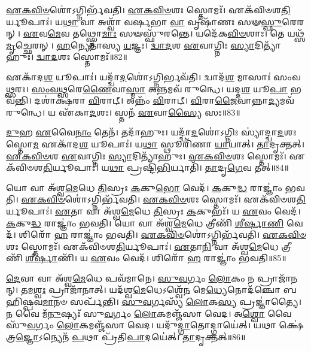 \-\ul{𑌏}\-\-\ul{𑌕}\-\-\ul{𑌵𑌿}\-\-\ul{𑍞}\-𑌶𑍋॑\-𑌽𑌗𑍍𑌨𑌿𑌰𑍍𑌭᳴𑌵𑌤𑌿।
\-\ul{𑌏}\-\-\ul{𑌕}\-\-\ul{𑌵𑌿}\-\-\ul{𑍞}\-𑌶𑌃 𑌸𑍍𑌤𑍋𑌮𑌃᳴।
𑌏𑌕᳴\-𑌵𑌿𑍞𑌶\-\ul{𑌤𑌿}\-𑌰𑍍𑌯𑍂𑌪𑌾𑌃॑।
𑌯\-\ul{𑌥𑌾} 𑌵𑌾 𑌅𑌶𑍍𑌵𑌾᳴ 𑌵𑌰𑍍\mbox{}\-\ul{𑌷}\-𑌭𑌾 \ul{𑌵𑌾} 𑌵𑍃𑌷𑌾᳴𑌣𑌃 𑌸𑍟\-\ul{𑌸𑍍𑌫𑍁}\-𑌰𑍇𑌰𑌨𑍍।
\-\ul{𑌏}\-𑌵\-\ul{𑌮𑍇}\-𑌵 𑌤𑌥𑍍𑌸𑍍𑌤𑍋\-\ul{𑌮𑌾𑌃} 𑌸𑍟𑌸𑍍𑌫𑍁᳴𑌰𑌨𑍍𑌤𑍇।
𑌯𑌦𑍇᳴𑌕\-\ul{𑌵𑌿}\-\-\ul{𑍞}\-𑌶𑌾𑌃।
𑌤𑍇 𑌯𑌥𑍍𑌸᳴\-\ul{𑌮𑍃}\-𑌚𑍍𑌛𑍇𑌰𑌨𑍍।
\-\ul{𑌹}\-𑌨𑍍𑌯𑍇𑌤𑌾॑𑌸𑍍𑌯 \ul{𑌯}\-𑌜𑍍𑌞𑌃।
\-\ul{𑌦𑍍𑌵𑌾}\-\-\ul{𑌦}\-𑌶 \ul{𑌏}\-𑌵𑌾𑌗𑍍𑌨𑌿𑌃 \ul{𑌸𑍍𑌯𑌾}\-𑌦𑌿𑌤𑍍𑌯𑌾᳴𑌹𑍁𑌃।
\-\ul{𑌦𑍍𑌵𑌾}\-\-\ul{𑌦}\-𑌶𑌃 𑌸𑍍𑌤𑍋𑌮𑌃᳴॥82॥

𑌏𑌕𑌾᳴𑌦\-\ul{𑌶} 𑌯𑍂𑌪𑌾𑌃॑।
𑌯𑌦𑍍𑌦𑍍𑌵𑌾᳴\-\ul{𑌦}\-𑌶𑍋॑\-𑌽𑌗𑍍𑌨𑌿𑌰𑍍𑌭𑌵᳴𑌤𑌿।
𑌦𑍍𑌵𑌾𑌦᳴\-\ul{𑌶} 𑌮𑌾𑌸𑌾𑌃॑ 𑌸𑌂𑌵\-\ul{𑌥𑍍𑌸}\-𑌰𑌃।
\-\ul{𑌸𑌂}\-\-\ul{𑌵}\-\-\ul{𑌥𑍍𑌸}\-𑌰𑍇\-\ul{𑌣𑍈}\-𑌵𑌾\-\ul{𑌸𑍍𑌮𑌾} 𑌅\-\ul{𑌨𑍍𑌨}\-𑌮𑌵᳴ 𑌰𑍁𑌨𑍍𑌧𑍇।
𑌯𑌦𑍍𑌦\-\ul{𑌶} 𑌯𑍂\-\ul{𑌪𑌾} 𑌭𑌵᳴𑌨𑍍𑌤𑌿।
𑌦𑌶𑌾॑𑌕𑍍𑌷𑌰𑌾 \ul{𑌵𑌿}\-𑌰𑌾𑌟𑍍।
𑌅𑌨𑍍𑌨𑌂᳴ \ul{𑌵𑌿}\-𑌰𑌾𑌟𑍍।
\-\ul{𑌵𑌿}\-𑌰𑌾\-\ul{𑌜𑍈}\-𑌵𑌾𑌨𑍍𑌨𑌾\-\ul{𑌦𑍍𑌯}\-𑌮𑌵᳴ 𑌰𑍁𑌨𑍍𑌧𑍇।
𑌯 𑌏᳴𑌕𑌾\-\ul{𑌦}\-𑌶𑌃।
𑌸𑍍𑌤𑌨᳴ \ul{𑌏}\-𑌵𑌾\-\ul{𑌸𑍍𑌯𑍈} 𑌸𑌃॥83॥

\-\ul{𑌦𑍁}\-𑌹 \ul{𑌏}\-𑌵𑍈\-\ul{𑌨𑌾𑌂} 𑌤𑍇𑌨᳴।
𑌤𑌦𑌾᳴𑌹𑍁𑌃।
𑌯𑌦𑍍𑌦𑍍𑌵𑌾᳴\-\ul{𑌦}\-𑌶𑍋॑\-𑌽𑌗𑍍𑌨𑌿𑌃 𑌸𑍍𑌯𑌾॑𑌦𑍍𑌦𑍍𑌵𑌾\-\ul{𑌦}\-𑌶𑌃 𑌸𑍍𑌤𑍋\-\ul{𑌮} 𑌏𑌕𑌾᳴𑌦\-\ul{𑌶} 𑌯𑍂𑌪𑌾𑌃॑।
𑌯\-\ul{𑌥𑌾} 𑌸𑍍𑌥𑍂𑌰𑌿᳴𑌣𑌾 \ul{𑌯𑌾}\-𑌯𑌾𑌤𑍍।
\-\ul{𑌤𑌾}\-𑌦𑍃𑌕𑍍𑌤𑌤𑍍।
\-\ul{𑌏}\-\-\ul{𑌕}\-\-\ul{𑌵𑌿}\-\-\ul{𑍞}\-𑌶 \ul{𑌏}\-𑌵𑌾𑌗𑍍𑌨𑌿𑌃 \ul{𑌸𑍍𑌯𑌾}\-𑌦𑌿𑌤𑍍𑌯𑌾᳴𑌹𑍁𑌃।
\-\ul{𑌏}\-\-\ul{𑌕}\-\-\ul{𑌵𑌿}\-\-\ul{𑍞}\-𑌶𑌃 𑌸𑍍𑌤𑍋𑌮𑌃᳴।
𑌏𑌕᳴𑌵𑌿𑍞𑌶\-\ul{𑌤𑌿}\-𑌰𑍍𑌯𑍂𑌪𑌾𑌃॑।
𑌯\-\ul{𑌥𑌾} 𑌪𑍍𑌰𑌷𑍍𑌟𑌿᳴\-\ul{𑌭𑌿}\-𑌰𑍍𑌯𑌾𑌤𑌿᳴।
\-\ul{𑌤𑌾}\-𑌦𑍃\-\ul{𑌗𑍇}\-𑌵 𑌤𑌤𑍍॥84॥

𑌯𑍋 𑌵𑌾 𑌅᳴𑌶𑍍𑌵\-\ul{𑌮𑍇}\-𑌧𑍇 \ul{𑌤𑌿}\-𑌸𑍍𑌰𑌃 \ul{𑌕}\-𑌕𑍁\-\ul{𑌭𑍋} 𑌵𑍇𑌦᳴।
\-\ul{𑌕}\-𑌕𑍁\-\ul{𑌦𑍍𑌧} 𑌰𑌾𑌜𑍍𑌞𑌾𑌂॑ 𑌭𑌵𑌤𑌿।
\-\ul{𑌏}\-\-\ul{𑌕}\-\-\ul{𑌵𑌿}\-\-\ul{𑍞}\-𑌶𑍋॑\-𑌽𑌗𑍍𑌨𑌿𑌰𑍍𑌭᳴𑌵𑌤𑌿।
\-\ul{𑌏}\-\-\ul{𑌕}\-\-\ul{𑌵𑌿}\-\-\ul{𑍞}\-𑌶𑌃 𑌸𑍍𑌤𑍋𑌮𑌃᳴।
𑌏𑌕᳴𑌵𑌿𑍞𑌶\-\ul{𑌤𑌿}\-𑌰𑍍𑌯𑍂𑌪𑌾𑌃॑।
\-\ul{𑌏}\-𑌤𑌾 𑌵𑌾 𑌅᳴𑌶𑍍𑌵\-\ul{𑌮𑍇}\-𑌧𑍇 \ul{𑌤𑌿}\-𑌸𑍍𑌰𑌃 \ul{𑌕}\-𑌕𑍁𑌭𑌃᳴।
𑌯 \ul{𑌏}\-𑌵𑌂 𑌵𑍇𑌦᳴।
\-\ul{𑌕}\-𑌕𑍁\-\ul{𑌦𑍍𑌧} 𑌰𑌾𑌜𑍍𑌞𑌾𑌂॑ 𑌭𑌵𑌤𑌿।
𑌯𑍋 𑌵𑌾 𑌅᳴𑌶𑍍𑌵\-\ul{𑌮𑍇}\-𑌧𑍇 𑌤𑍍𑌰𑍀𑌣𑌿᳴ \ul{𑌶𑍀}\-\-\ul{𑌰𑍍}\-𑌷𑌾\-\ul{𑌣𑌿} 𑌵𑍇𑌦᳴।
𑌶𑌿𑌰𑍋᳴ \ul{𑌹} 𑌰𑌾𑌜𑍍𑌞𑌾𑌂॑ 𑌭𑌵𑌤𑌿।
\-\ul{𑌏}\-\-\ul{𑌕}\-\-\ul{𑌵𑌿}\-\-\ul{𑍞}\-𑌶𑍋॑\-𑌽𑌗𑍍𑌨𑌿𑌰𑍍𑌭᳴𑌵𑌤𑌿।
\-\ul{𑌏}\-\-\ul{𑌕}\-\-\ul{𑌵𑌿}\-\-\ul{𑍞}\-𑌶𑌃 𑌸𑍍𑌤𑍋𑌮𑌃᳴।
𑌏𑌕᳴𑌵𑌿𑍞𑌶\-\ul{𑌤𑌿}\-𑌰𑍍𑌯𑍂𑌪𑌾𑌃॑।
\-\ul{𑌏}\-𑌤𑌾\-\ul{𑌨𑌿} 𑌵𑌾 𑌅᳴𑌶𑍍𑌵\-\ul{𑌮𑍇}\-𑌧𑍇 𑌤𑍍𑌰𑍀𑌣𑌿᳴ \ul{𑌶𑍀}\-\-\ul{𑌰𑍍}\-𑌷𑌾𑌣𑌿᳴।
𑌯 \ul{𑌏}\-𑌵𑌂 𑌵𑍇𑌦᳴।
𑌶𑌿𑌰𑍋᳴ \ul{𑌹} 𑌰𑌾𑌜𑍍𑌞𑌾𑌂॑ 𑌭𑌵𑌤𑌿॥85॥\anuvakamend[\-\ul{𑌦𑍍𑌵𑌾}\-\-\ul{𑌦}\-𑌶𑌃 𑌸𑍍𑌤𑍋\-\ul{𑌮𑌃} 𑌸 \ul{𑌏}\-𑌵 𑌤𑌚𑍍𑌛𑌿𑌰𑍋᳴ \ul{𑌹} 𑌰𑌾𑌜𑍍𑌞𑌾𑌂॑ 𑌭𑌵\-\ul{𑌤𑌿} 𑌷𑌟𑍍 𑌚᳴]

\-\ul{𑌦𑍇}\-𑌵𑌾 𑌵𑌾 𑌅᳴𑌶𑍍𑌵\-\ul{𑌮𑍇}\-𑌧𑍇 𑌪𑌵᳴𑌮𑌾𑌨𑍇।
\-\ul{𑌸𑍁}\-\-\ul{𑌵}\-𑌰𑍍𑌗𑌂 \ul{𑌲𑍋}\-𑌕𑌂 𑌨 𑌪𑍍𑌰𑌾𑌜𑌾᳴𑌨𑌨𑍍।
𑌤𑌮\-\ul{𑌶𑍍𑌵𑌃} 𑌪𑍍𑌰𑌾𑌜𑌾᳴𑌨𑌾𑌤𑍍।
𑌯𑌦᳴𑌶𑍍𑌵\-\ul{𑌮𑍇}\-𑌧𑍇\-𑌽𑌶𑍍𑌵𑍇᳴\-\ul{𑌨} 𑌮𑍇\-\ul{𑌧𑍍𑌯𑍇}\-𑌨𑍋𑌦᳴𑌞𑍍𑌚𑍋 𑌬𑌹𑌿𑌷𑍍𑌪𑌵\-\ul{𑌮𑌾}\-𑌨𑍞 𑌸𑌰𑍍𑌪᳴𑌨𑍍𑌤𑌿।
\-\ul{𑌸𑍁}\-\-\ul{𑌵}\-𑌰𑍍𑌗𑌸𑍍𑌯᳴ \ul{𑌲𑍋}\-𑌕\-\ul{𑌸𑍍𑌯} 𑌪𑍍𑌰𑌜𑍍𑌞𑌾॑𑌤𑍍𑌯𑍈।
𑌨 𑌵𑍈 𑌮᳴\-\ul{𑌨𑍁}\-𑌷𑍍𑌯𑌃᳴ 𑌸𑍁\-\ul{𑌵}\-𑌰𑍍𑌗𑌂 \ul{𑌲𑍋}\-𑌕𑌮𑌞𑍍𑌜᳴𑌸𑌾 𑌵𑍇𑌦।
𑌅\-\ul{𑌶𑍍𑌵𑍋} 𑌵𑍈 𑌸𑍁᳴\-\ul{𑌵}\-𑌰𑍍𑌗𑌂 \ul{𑌲𑍋}\-𑌕𑌮𑌞𑍍𑌜᳴𑌸𑌾 𑌵𑍇𑌦।
𑌯𑌦𑍁᳴\-\ul{𑌦𑍍𑌗𑌾}\-𑌤𑍋𑌦𑍍𑌗𑌾𑌯𑍇॑𑌤𑍍।
𑌯𑌥𑌾 𑌕𑍍𑌷𑍇॑𑌤𑍍𑌰\-\ul{𑌜𑍍𑌞𑍋}\-\-𑌽𑌨𑍍𑌯𑍇𑌨᳴ \ul{𑌪}\-𑌥𑌾 𑌪𑍍𑌰᳴𑌤𑌿\-\ul{𑌪𑌾}\-𑌦𑌯𑍇॑𑌤𑍍।
\-\ul{𑌤𑌾}\-𑌦𑍃𑌕𑍍𑌤𑌤𑍍॥86॥

